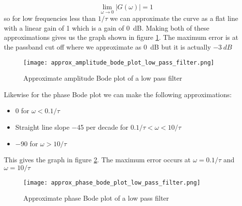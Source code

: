 \documentclass{article}
\begin{document}
    \[\lim_{\omega\to 0}|G(\omega)| = 1\]
    so for low frequencies less than \(1/\tau\) we can approximate the curve as a flat line with a linear gain of 1 which is a gain of \SI{0}{dB}.
    Making both of these approximations gives us the graph shown in figure \ref{fig:amplitude bode plot LPF approx}. The maximum error is at the passband cut off where we approximate as \SI{0}{dB} but it is actually \(-\SI{3}{dB}\)
    \begin{figure}[ht]
        \centering
        \texttt{[image: approx\_amplitude\_bode\_plot\_low\_pass\_filter.png]}
        \caption{Approximate amplitude Bode plot of a low pass filter}
        \label{fig:amplitude bode plot LPF approx}
    \end{figure}
    Likewise for the phase Bode plot we can make the following approximations:
    \begin{itemize}
        \item \SI{0}{\SIUnitSymbolDegree} for \(\omega < 0.1/\tau\)
        \item Straight line slope \SI{-45}{\SIUnitSymbolDegree} per decade for \(0.1/\tau < \omega < 10/\tau\)
        \item \SI{-90}{\SIUnitSymbolDegree} for \(\omega > 10/\tau\)
    \end{itemize}
    This gives the graph in figure \ref{fig:phase bode plot LPF approx}. The maximum error occurs at \(\omega = 0.1/\tau\) and \(\omega = 10/\tau\)
    \begin{figure}[ht]
        \centering
        \texttt{[image: approx\_phase\_bode\_plot\_low\_pass\_filter.png]}
        \caption{Approximate phase Bode plot of a low pass filter}
        \label{fig:phase bode plot LPF approx}
    \end{figure}
        
\end{document}
